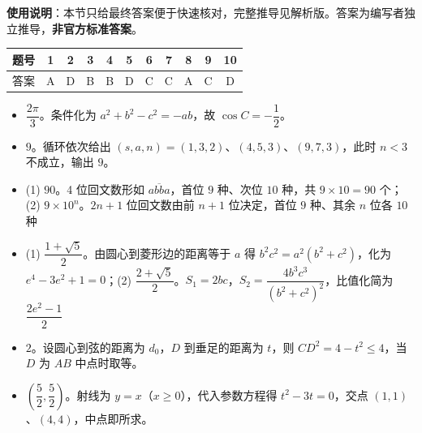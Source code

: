 
\begin{gknotice}
\textbf{使用说明}：本节只给最终答案便于快速核对，完整推导见解析版。答案为编写者独立推导，\textbf{非官方标准答案}。
\end{gknotice}

\begin{center}\begin{tabular}{ccccccccccc}
\toprule
题号 & 1 & 2 & 3 & 4 & 5 & 6 & 7 & 8 & 9 & 10 \\
\midrule
答案 & A & D & B & B & D & C & C & A & C & D \\
\bottomrule
\end{tabular}\end{center}

\begin{itemize}[leftmargin=2.6em]
  \item[\textbf{11.}] $\dfrac{2\pi}{3}$。条件化为 $a^2+b^2-c^2=-ab$，故 $\cos C=-\dfrac12$。
  \item[\textbf{12.}] $9$。循环依次给出 $(s,a,n)=(1,3,2)$、$(4,5,3)$、$(9,7,3)$，此时 $n<3$ 不成立，输出 $9$。
  \item[\textbf{13.}] (1) $90$。4 位回文数形如 $\overline{abba}$，首位 $9$ 种、次位 $10$ 种，共 $9\times10=90$ 个；(2) $9\times10^n$。$2n+1$ 位回文数由前 $n+1$ 位决定，首位 $9$ 种、其余 $n$ 位各 $10$ 种
  \item[\textbf{14.}] (1) $\dfrac{1+\sqrt5}{2}$。由圆心到菱形边的距离等于 $a$ 得 $b^2c^2=a^2(b^2+c^2)$，化为 $e^4-3e^2+1=0$；(2) $\dfrac{2+\sqrt5}{2}$。$S_1=2bc$，$S_2=\dfrac{4b^3c^3}{(b^2+c^2)^2}$，比值化简为 $\dfrac{2e^2-1}{2}$
  \item[\textbf{15.}] $2$。设圆心到弦的距离为 $d_0$，$D$ 到垂足的距离为 $t$，则 $CD^2=4-t^2\leqslant4$，当 $D$ 为 $AB$ 中点时取等。
  \item[\textbf{16.}] $\left(\dfrac52,\dfrac52\right)$。射线为 $y=x$（$x\geqslant0$），代入参数方程得 $t^2-3t=0$，交点 $(1,1)$、$(4,4)$，中点即所求。
\end{itemize}

